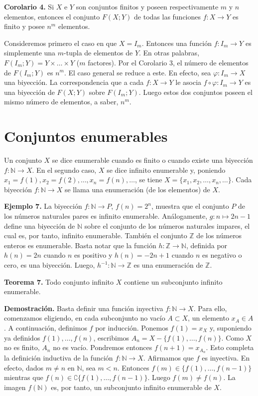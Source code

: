 \documentclass[12pt,oneside]{book}
\begin{document}
\textbf{Corolario 4.} Si \( X \) e \( Y \) son conjuntos finitos y poseen respectivamente \( m \) y \( n \) elementos, entonces el conjunto \( F(X;Y) \) de todas las funciones \( f: X \to Y \) es finito y posee \( n^m \) elementos.

Consideremos primero el caso en que \( X = I_m \). Entonces una función \( f: I_m \to Y \) es simplemente una \( m \)-tupla de elementos de \( Y \). En otras palabras, \( F(I_m;Y) = Y \times \dots \times Y \) (\( m \) factores). Por el Corolario 3, el número de elementos de \( F(I_m;Y) \) es \( n^m \). El caso general se reduce a este. En efecto, sea \( \varphi: I_m \to X \) una biyección. La correspondencia que a cada \( f: X \to Y \) le asocia \( f \circ \varphi: I_m \to Y \) es una biyección de \( F(X;Y) \) sobre \( F(I_m;Y) \). Luego estos dos conjuntos poseen el mismo número de elementos, a saber, \( n^m \).

\section{Conjuntos enumerables}

Un conjunto \( X \) se dice enumerable cuando es finito o cuando existe una biyección \( f: \mathbb{N} \to X \). En el segundo caso, \( X \) se dice infinito enumerable y, poniendo \( x_1 = f(1), x_2 = f(2), \dots, x_n = f(n), \dots \), se tiene \( X = \{x_1, x_2, \dots, x_n, \dots\} \). Cada biyección \( f: \mathbb{N} \to X \) se llama una enumeración (de los elementos) de \( X \).

\textbf{Ejemplo 7.} La biyección \( f: \mathbb{N} \to P \), \( f(n) = 2^n \), muestra que el conjunto \( P \) de los números naturales pares es infinito enumerable. Análogamente, \( g: n \mapsto 2n-1 \) define una biyección de \( \mathbb{N} \) sobre el conjunto de los números naturales impares, el cual es, por tanto, infinito enumerable. También el conjunto \( \mathbb{Z} \) de los números enteros es enumerable. Basta notar que la función \( h: \mathbb{Z} \to \mathbb{N} \), definida por \( h(n) = 2n \) cuando \( n \) es positivo y \( h(n) = -2n + 1 \) cuando \( n \) es negativo o cero, es una biyección. Luego, \( h^{-1}: \mathbb{N} \to \mathbb{Z} \) es una enumeración de \( \mathbb{Z} \).

\textbf{Teorema 7.} Todo conjunto infinito \( X \) contiene un subconjunto infinito enumerable.

\textbf{Demostración.} Basta definir una función inyectiva \( f: \mathbb{N} \to X \). Para ello, comenzamos eligiendo, en cada subconjunto no vacío \( A \subset X \), un elemento \( x_A \in A \). A continuación, definimos \( f \) por inducción. Ponemos \( f(1) = x_X \) y, suponiendo ya definidos \( f(1), \dots, f(n) \), escribimos \( A_n = X - \{f(1), \dots, f(n)\} \). Como \( X \) no es finito, \( A_n \) no es vacío. Pondremos entonces \( f(n+1) = x_{A_n} \). Esto completa la definición inductiva de la función \( f: \mathbb{N} \to X \). Afirmamos que \( f \) es inyectiva. En efecto, dados \( m \neq n \) en \( \mathbb{N} \), sea \( m < n \). Entonces \( f(m) \in \{f(1), \dots, f(n-1)\} \) mientras que \( f(n) \in \complement \{f(1), \dots, f(n-1)\} \). Luego \( f(m) \neq f(n) \). La imagen \( f(\mathbb{N}) \) es, por tanto, un subconjunto infinito enumerable de \( X \).
\end{document}
